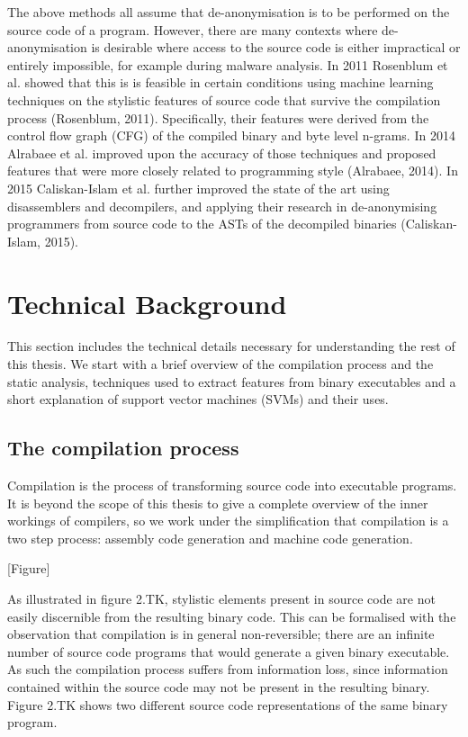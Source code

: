 \documentclass[a4paper,11pt]{kth-mag}
\begin{document}
The above methods all assume that de-anonymisation is to be performed on the
source code of a program. However, there are many contexts where
de-anonymisation is desirable where access to the source code is either
impractical or entirely impossible, for example during malware analysis. In
2011 Rosenblum et al. showed that this is is feasible in certain conditions
using machine learning techniques on the stylistic features of source code that
survive the compilation process (Rosenblum, 2011). Specifically, their features
were derived from the control flow graph (CFG) of the compiled binary and byte
level n-grams. In 2014 Alrabaee et al. improved upon the accuracy of those
techniques and proposed features that were more closely related to programming
style (Alrabaee, 2014). In 2015 Caliskan-Islam et al. further improved the
state of the art using disassemblers and decompilers, and applying their
research in de-anonymising programmers from source code to the ASTs of the
decompiled binaries (Caliskan-Islam, 2015).

\section{Technical Background}
This section includes the technical details necessary for understanding the rest of this thesis. We start with a brief overview of the compilation process and the static analysis, techniques used to extract features from binary executables and a short explanation of support vector machines (SVMs) and their uses. 

\subsection{The compilation process}
 Compilation is the process of transforming source code into executable programs. It is beyond the scope of this thesis to give a complete overview of the inner workings of compilers, so we work under the simplification that compilation is a two step process: assembly code generation and machine code generation.

[Figure]

As illustrated in figure 2.TK, stylistic elements present in source code are
not easily discernible from the resulting binary code. This can be formalised
with the observation that compilation is in general non-reversible; there are
an infinite number of source code programs that would generate a given binary
executable. As such the compilation process suffers from information loss,
since information contained within the source code may not be present in the
resulting binary. Figure 2.TK shows two different source code representations
of the same binary program.
\end{document}
